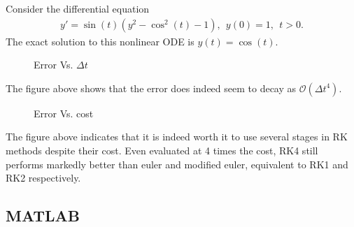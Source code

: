 Consider the differential equation
\begin{align*}
y' = \sin(t)(y^2 - \cos^2(t) -1),~~y(0)=1,~~t>0.
\end{align*}
The exact solution to this nonlinear ODE is $y(t) = \cos(t)$.

\begin{questions}


\begin{solution}

\begin{figure}[H]
\caption{Error Vs. $\Delta t$}
\end{figure}

The figure above shows that the error does indeed seem to decay as $\mathcal{O}(\Delta t^4)$.

\end{solution}


\begin{solution}

\begin{figure}[H]
\caption{Error Vs. cost}
\end{figure}

The figure above indicates that it is indeed worth it to use several stages in RK methods despite their cost. Even evaluated at 4 times the cost, RK4 still performs markedly better than euler and modified euler, equivalent to RK1 and RK2 respectively. 

\end{solution}

\end{questions}

\subsection*{MATLAB}

